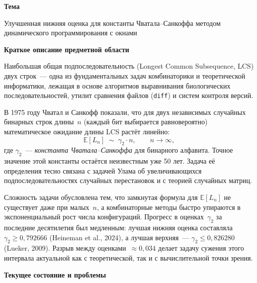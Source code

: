 \documentclass[12pt,a4paper]{article}
\begin{document}
\textbf{\large Тема}

\medskip
Улучшенная нижняя оценка для константы Чватала--Санкоффа методом динамического программирования с окнами

\bigskip

\textbf{\large Краткое описание предметной области}

\medskip
Наибольшая общая подпоследовательность (Longest Common Subsequence, LCS) двух строк~--- одна из фундаментальных задач комбинаторики и теоретической информатики, лежащая в основе алгоритмов выравнивания биологических последовательностей, утилит сравнения файлов (\texttt{diff}) и систем контроля версий.

В 1975 году Чватал и Санкофф показали, что для двух независимых случайных бинарных строк длины~$n$ (каждый бит выбирается равновероятно) математическое ожидание длины LCS растёт линейно:
\[
  \mathbb{E}[L_n] \;\sim\; \gamma_2 \cdot n, \qquad n \to \infty,
\]
где $\gamma_2$~--- \emph{константа Чватала--Санкоффа} для бинарного алфавита. Точное значение этой константы остаётся неизвестным уже 50 лет. Задача её определения тесно связана с задачей Улама об увеличивающихся подпоследовательностях случайных перестановок и с теорией случайных матриц.

Сложность задачи обусловлена тем, что замкнутая формула для $\mathbb{E}[L_n]$ не существует даже при малых~$n$, а комбинаторные методы быстро упираются в экспоненциальный рост числа конфигураций. Прогресс в оценках~$\gamma_2$ за последние десятилетия был медленным: лучшая нижняя оценка составляла $\gamma_2 \geq 0{,}792666$ (Heineman et al., 2024), а лучшая верхняя~--- $\gamma_2 \leq 0{,}826280$ (Lueker, 2009). Разрыв между оценками~$\approx 0{,}034$ делает задачу сужения этого интервала актуальной как с теоретической, так и с вычислительной точки зрения.

\bigskip

\textbf{\large Текущее состояние и проблемы}
\end{document}
